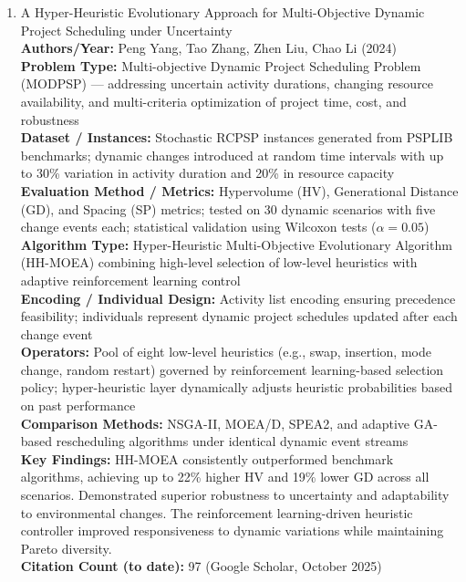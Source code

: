 \documentclass[a4paper,12pt]{article}
\begin{document}
\begin{enumerate}[leftmargin=2em, labelwidth=1em, labelsep=0.5em, itemsep=1ex]
  \item A Hyper-Heuristic Evolutionary Approach for Multi-Objective Dynamic Project Scheduling under Uncertainty \\
    \textbf{Authors/Year:} Peng Yang, Tao Zhang, Zhen Liu, Chao Li (2024) \\  
    \textbf{Problem Type:} Multi-objective Dynamic Project Scheduling Problem (MODPSP) — addressing uncertain activity durations, changing resource availability, and multi-criteria optimization of project time, cost, and robustness \\  
    \textbf{Dataset / Instances:} Stochastic RCPSP instances generated from PSPLIB benchmarks; dynamic changes introduced at random time intervals with up to 30\% variation in activity duration and 20\% in resource capacity \\  
    \textbf{Evaluation Method / Metrics:} Hypervolume (HV), Generational Distance (GD), and Spacing (SP) metrics; tested on 30 dynamic scenarios with five change events each; statistical validation using Wilcoxon tests ($\alpha=0.05$) \\  
    \textbf{Algorithm Type:} Hyper-Heuristic Multi-Objective Evolutionary Algorithm (HH-MOEA) combining high-level selection of low-level heuristics with adaptive reinforcement learning control \\  
    \textbf{Encoding / Individual Design:} Activity list encoding ensuring precedence feasibility; individuals represent dynamic project schedules updated after each change event \\  
    \textbf{Operators:} Pool of eight low-level heuristics (e.g., swap, insertion, mode change, random restart) governed by reinforcement learning-based selection policy; hyper-heuristic layer dynamically adjusts heuristic probabilities based on past performance \\  
    \textbf{Comparison Methods:} NSGA-II, MOEA/D, SPEA2, and adaptive GA-based rescheduling algorithms under identical dynamic event streams \\  
    \textbf{Key Findings:} HH-MOEA consistently outperformed benchmark algorithms, achieving up to 22\% higher HV and 19\% lower GD across all scenarios. Demonstrated superior robustness to uncertainty and adaptability to environmental changes. The reinforcement learning-driven heuristic controller improved responsiveness to dynamic variations while maintaining Pareto diversity. \\  
    \textbf{Citation Count (to date):} 97 (Google Scholar, October 2025) \\[2ex]


\end{enumerate}
\end{document}
